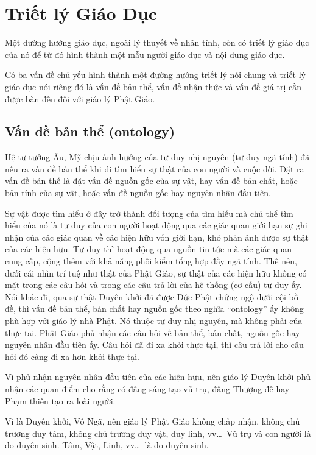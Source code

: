 \chapter{Triết lý Giáo Dục} %
\label{cha:triet_ly_giao_duc}

Một đường hướng giáo dục, ngoài lý thuyết về nhân tính, còn có triết lý giáo dục của nó để từ đó hình thành một mẫu người giáo dục và nội dung giáo dục.

Có ba vấn đề chủ yếu hình thành một đường hướng triết lý nói chung và triết lý giáo dục nói riêng đó là vấn đề bản thể, vấn đề nhận thức và vấn đề giá trị cần được bàn đến đối với giáo lý Phật Giáo.

\section{Vấn đề bản thể (ontology)} %
\label{sec:van_de_ban_the}

Hệ tư tưởng Âu, Mỹ chịu ảnh hưởng của tư duy nhị nguyên (tư duy ngã tính) đã nêu ra vấn đề bản thể khi đi tìm hiểu sự thật của con người và cuộc đời. Đặt ra vấn đề bản thể là đặt vấn đề nguồn gốc của sự vật, hay vấn đề bản chất, hoặc bản tính của sự vật, hoặc vấn đề nguồn gốc hay nguyên nhân đầu tiên.

Sự vật được tìm hiểu ở đây trở thành đối tượng của tìm hiểu mà chủ thể tìm hiểu của nó là tư duy của con người hoạt động qua các giác quan giới hạn sự ghi nhận của các giác quan về các hiện hữu vốn giới hạn, khó phản ảnh được sự thật của các hiện hữu. Tư duy thì hoạt động qua nguồn tin tức mà các giác quan cung cấp, cộng thêm với khả năng phối kiểm tổng hợp đầy ngã tính. Thế nên, dưới cái nhìn trí tuệ như thật của Phật Giáo, sự thật của các hiện hữu không có mặt trong các câu hỏi và trong các câu trả lời của hệ thống (cơ cấu) tư duy ấy. Nói khác đi, qua sự thật Duyên khởi đã được Đức Phật chứng ngộ dưới cội bồ đề, thì vấn đề bản thể, bản chất hay nguồn gốc theo nghĩa ``ontology'' ấy không phù hợp với giáo lý nhà Phật. Nó thuộc tư duy nhị nguyên, mà không phải của thực tai. Phật Giáo phủ nhận các câu hỏi về bản thể, bản chất, nguồn gốc hay nguyên nhân đầu tiên ấy. Câu hỏi đã đi xa khỏi thực tại, thì câu trả lời cho câu hỏi đó càng đi xa hơn khỏi thực tại.

Vì phủ nhận nguyên nhân đầu tiên của các hiện hữu, nên giáo lý Duyên khởi phủ nhận các quan điểm cho rằng có đấng sáng tạo vũ trụ, đấng Thượng đế hay Phạm thiên tạo ra loài người.

Vì là Duyên khởi, Vô Ngã, nên giáo lý Phật Giáo không chấp nhận, không chủ trương duy tâm, không chủ trương duy vật, duy linh, vv\ldots ~Vũ trụ và con người là do duyên sinh. Tâm, Vật, Linh, vv\ldots ~là do duyên sinh.


